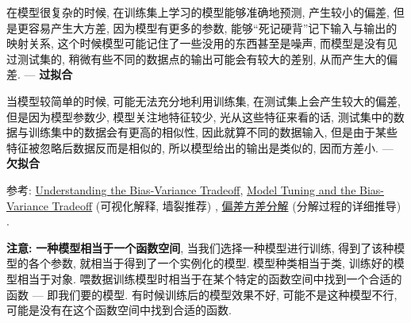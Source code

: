 在模型很复杂的时候, 在训练集上学习的模型能够准确地预测, 产生较小的偏差, 但是更容易产生大方差, 因为模型有更多的参数, 能够“死记硬背”记下输入与输出的映射关系, 这个时候模型可能记住了一些没用的东西甚至是噪声, 而模型是没有见过测试集的, 稍微有些不同的数据点的输出可能会有较大的差别, 从而产生大的偏差.  --- \textbf{过拟合}

当模型较简单的时候, 可能无法充分地利用训练集, 在测试集上会产生较大的偏差, 但是因为模型参数少, 模型关注地特征较少, 光从这些特征来看的话, 测试集中的数据与训练集中的数据会有更高的相似性, 因此就算不同的数据输入, 但是由于某些特征被忽略后数据反而是相似的, 所以模型给出的输出是类似的, 因而方差小. --- \textbf{欠拟合}

参考: \href{http://scott.fortmann-roe.com/docs/BiasVariance.html}{Understanding the Bias-Variance Tradeoff}, \href{http://www.r2d3.us/visual-intro-to-machine-learning-part-2/}{Model Tuning and
	the Bias-Variance Tradeoff} (可视化解释, 墙裂推荐) , \href{https://www.cnblogs.com/makefile/p/bias-var.html}{偏差方差分解} (分解过程的详细推导) . 


\textbf{注意: }\textbf{一种模型相当于一个函数空间}, 当我们选择一种模型进行训练, 得到了该种模型的各个参数, 就相当于得到了一个实例化的模型. 模型种类相当于类, 训练好的模型相当于对象. 喂数据训练模型时相当于在某个特定的函数空间中找到一个合适的函数 --- 即我们要的模型. 有时候训练后的模型效果不好, 可能不是这种模型不行, 可能是没有在这个函数空间中找到合适的函数. 


